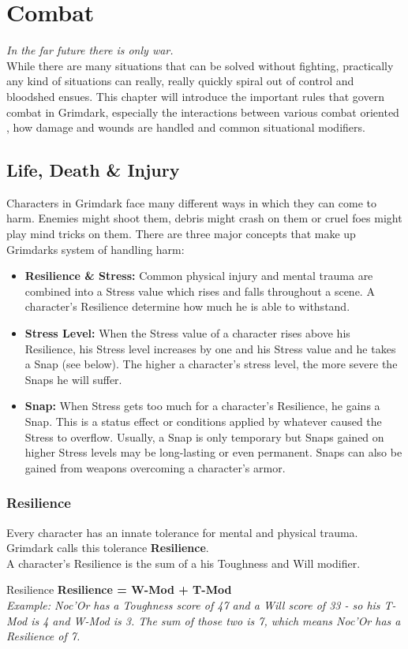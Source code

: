 \chapter{Combat}
\textit{In the far future there is only war.}\\
While there are many situations that can be solved without fighting, practically any kind of situations can really, really quickly spiral out of control and bloodshed ensues. 
This chapter will introduce the important rules that govern combat in Grimdark, especially the interactions between various combat oriented , how damage and wounds are handled and common situational modifiers.

\section{Life, Death \& Injury}
	Characters in Grimdark face many different ways in which they can come to harm.
	Enemies might shoot them, debris might crash on them or cruel foes might play mind tricks on them.
	There are three major concepts that make up Grimdarks system of handling harm:
	\begin{itemize}
		\item \textbf{Resilience \& Stress:} Common physical injury and mental trauma are combined into a Stress value which rises and falls throughout a scene. A character's Resilience determine how much he is able to withstand.
		\item \textbf{Stress Level:} When the Stress value of a character rises above his Resilience, his Stress level increases by one and his Stress value and he takes a Snap (see below). The higher a character's stress level, the more severe the Snaps he will suffer.
		\item \textbf{Snap:} When Stress gets too much for a character's Resilience, he gains a Snap. This is a status effect or conditions applied by whatever caused the Stress to overflow. Usually, a Snap is only temporary but Snaps gained on higher Stress levels may be long-lasting or even permanent. Snaps can also be gained from weapons overcoming a character's armor.
	\end{itemize}

\subsection{Resilience}\label{Resilience}
	Every character has an innate tolerance for mental and physical trauma.
	Grimdark calls this tolerance \textbf{Resilience}.\\
	A character's Resilience is the sum of a his Toughness and Will modifier.
	\begin{DndComment}{Resilience}
		\textbf{Resilience = W-Mod + T-Mod}\\
		\textit{Example: Noc'Or has a Toughness score of 47 and a Will score of 33 - so his T-Mod is 4 and W-Mod is 3. The sum of those two is 7, which means Noc'Or has a Resilience of 7.}
	\end{DndComment}

